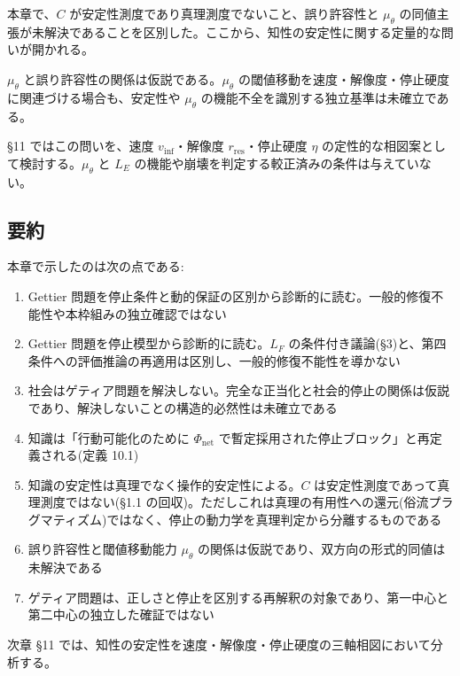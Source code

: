 本章で、$C$ が安定性測度であり真理測度でないこと、誤り許容性と $\mu_\theta$ の同値主張が未解決であることを区別した。ここから、知性の安定性に関する定量的な問いが開かれる。

$\mu_\theta$ と誤り許容性の関係は仮説である。$\mu_\theta$ の閾値移動を速度・解像度・停止硬度に関連づける場合も、安定性や $\mu_\theta$ の機能不全を識別する独立基準は未確立である。

\S{}11 ではこの問いを、速度 $v_{\text{inf}}$・解像度 $r_{\text{res}}$・停止硬度 $\eta$ の定性的な相図案として検討する。$\mu_\theta$ と $L_E$ の機能や崩壊を判定する較正済みの条件は与えていない。

\bigskip


\subsection{要約}


本章で示したのは次の点である:

\begin{enumerate}
\item Gettier 問題を停止条件と動的保証の区別から診断的に読む。一般的修復不能性や本枠組みの独立確認ではない
\item Gettier 問題を停止模型から診断的に読む。$L_F$ の条件付き議論(\S{}3)と、第四条件への評価推論の再適用は区別し、一般的修復不能性を導かない
\item 社会はゲティア問題を解決しない。完全な正当化と社会的停止の関係は仮説であり、解決しないことの構造的必然性は未確立である
\item 知識は「行動可能化のために $\Phi_{\text{net}}$ で暫定採用された停止ブロック」と再定義される(定義 10.1)
\item 知識の安定性は真理でなく操作的安定性による。$C$ は安定性測度であって真理測度ではない(\S{}1.1 の回収)。ただしこれは真理の有用性への還元(俗流プラグマティズム)ではなく、停止の動力学を真理判定から分離するものである
\item 誤り許容性と閾値移動能力 $\mu_\theta$ の関係は仮説であり、双方向の形式的同値は未解決である
\item ゲティア問題は、正しさと停止を区別する再解釈の対象であり、第一中心と第二中心の独立した確証ではない
\end{enumerate}


次章 \S{}11 では、知性の安定性を速度・解像度・停止硬度の三軸相図において分析する。

\bigskip
